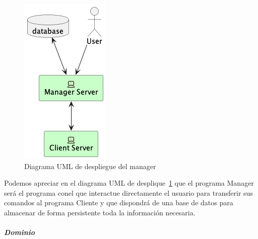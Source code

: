 \begin{figure}[H]
    \centering
    \includegraphics[height=0.4\textheight]{./part/Proyecto_ejecutivo/memoria_descriptiva/descripcionDelProyecto/manager/uml/managerServerConcept}
    \caption{Diagrama UML de despliegue del manager}\label{fig:diagrama_uml_de_despliegue_del_manager}
\end{figure}

Podemos apreciar en el diagrama UML de desplique~\cref{fig:diagrama_uml_de_despliegue_del_manager} que el programa Manager será el programa conel que interactue directamente el usuario para transferir sus comandos al programa Cliente y que dispondrá de una base de datos para almacenar de forma persistente toda la información necesaria.

\subparagraph{Dominio}

